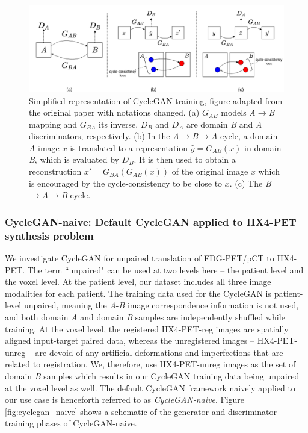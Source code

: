 \begin{figure}
    \centering
    \includegraphics[width=\textwidth]{figures/GANs/cyclegan_concept.png}
    \caption{Simplified representation of CycleGAN training, figure adapted from the original paper \cite{zhu2017unpaired} with notations changed. (a) $G_{AB}$ models \textit{A}$\rightarrow$\textit{B} mapping and $G_{BA}$ its inverse. $D_B$ and $D_A$ are domain \textit{B} and \textit{A} discriminators, respectively. (b) In the \textit{A}$\rightarrow$\textit{B}$\rightarrow$\textit{A} cycle, a domain \textit{A} image $x$ is translated to a representation \textit{$\hat{y} = G_{AB}(x)$} in domain \textit{B}, which is evaluated by $D_B$. It is then used to obtain a reconstruction $x' = G_{BA}(G_{AB}(x))$ of the original image $x$ which is encouraged by the cycle-consistency to be close to $x$. (c) The \textit{B}$\rightarrow$\textit{A}$\rightarrow$\textit{B} cycle.}
    \label{fig:cyclegan_concept}
\end{figure}


\subsubsection{CycleGAN-naive: Default CycleGAN applied to HX4-PET synthesis problem}
We investigate CycleGAN for unpaired translation of FDG-PET/pCT to HX4-PET. The term ``unpaired" can be used at two levels here -- the patient level and the voxel level. At the patient level, our dataset includes all three image modalities for each patient. The training data used for the CycleGAN is patient-level unpaired, meaning the \textit{A}-\textit{B} image correspondence information is not used, and both domain \textit{A} and domain \textit{B} samples are independently shuffled while training. At the voxel level, the registered HX4-PET-reg images are spatially aligned input-target paired data, whereas the unregistered images -- HX4-PET-unreg -- are devoid of any artificial deformations and imperfections that are related to registration. We, therefore, use HX4-PET-unreg images as the set of domain \textit{B} samples which results in our CycleGAN training data being unpaired at the voxel level as well. The default CycleGAN framework naively applied to our use case is henceforth referred to as \textit{CycleGAN-naive}. Figure \ref{fig:cyclegan_naive} shows a schematic of the generator and discriminator training phases of CycleGAN-naive. 

